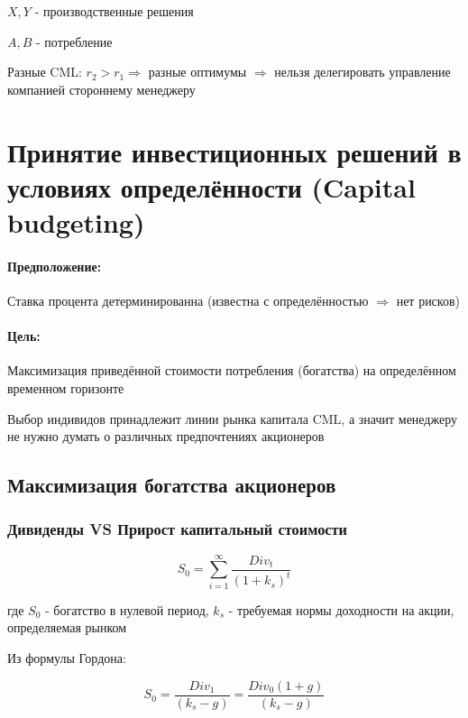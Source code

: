 \documentclass[a4paper,12pt]{article} %
\begin{document}
 $  X, Y $ - производственные решения
 
 $ A, B $ - потребление
  
    Разные CML: $ r_2> r_1 \Rightarrow $ разные оптимумы  $ \Rightarrow $    
    нельзя делегировать управление компанией стороннему  менеджеру 
    
    
    \newpage
    
    
 \section{Принятие инвестиционных решений в условиях определённости (Capital budgeting)}
 
    \paragraph{Предположение:}
  
  Ставка процента детерминированна (известна с определённостью $ \Rightarrow $ нет рисков)
  
  
  
  \paragraph{Цель: } 
  
  Максимизация приведённой стоимости потребления (богатства) на определённом временном горизонте 
    
  
Выбор индивидов принадлежит линии рынка капитала CML,  а значит менеджеру не нужно думать о различных предпочтениях акционеров
  
  
  \subsection{ Максимизация богатства акционеров}
  
\subsubsection{Дивиденды VS Прирост капитальный стоимости}

\[ S_0 = \sum_{i=1}^{\infty} \dfrac{Div_t}{(1+k_s)^t} \]
  
  где
 $ S_0 $  - богатство в нулевой период, 
  $ k_s $ -  требуемая нормы доходности на акции,  определяемая рынком
  
  Из формулы Гордона:
   
   \[ S_0 = \dfrac{Div_1}{(k_s-g)} =  \dfrac{Div_0 (1+g)}{(k_s-g)} \]
   
\end{document}
